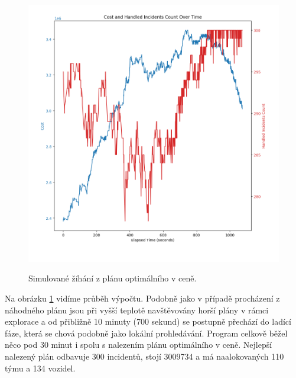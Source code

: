 \begin{figure}[H]
  \caption{Simulované žíhání z plánu optimálního v ceně.}
  \includegraphics[width=\textwidth]{img/sa_optimal.png}
  \centering
  \label{img:sa_optimal}
\end{figure}

Na obrázku \ref{img:sa_optimal} vidíme průběh výpočtu.
Podobně jako v případě procházení z náhodného plánu jsou při vyšší teplotě navštěvovány horší plány v rámci explorace a od přibližně 
10 minuty (700 sekund) se postupně přechází do ladící fáze, která se chová podobně jako lokální prohledávání.
Program celkově běžel něco pod 30 minut i spolu s nalezením plánu optimálního v ceně.
Nejlepší nalezený plán odbavuje 300 incidentů, stojí 3009734 a má naalokovaných 110 týmu a 134 vozidel.


